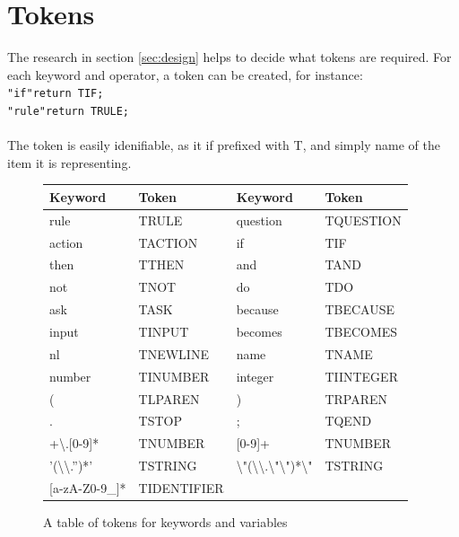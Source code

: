 \documentclass[12pt]{report}
\begin{document}
\section{Tokens}\label{sec:tokens}
The research in section \ref{sec:design} helps to decide what tokens are required.  For each keyword and operator, a token can be created, for instance:\\
\texttt{"if"\quad\quad\quad return TIF;}\\
\texttt{"rule"\quad\quad return TRULE;}\\
\\
The token is easily idenifiable, as it if prefixed with T, and simply name of the item it is representing.
\begin{figure}[H]
	\begin{center}
		\begin{tabular}{ | l | l || l | l |}
			\hline
			\textbf{Keyword} & \textbf{Token} & \textbf{Keyword} & \textbf{Token} \\ \hline
			rule & TRULE & question & TQUESTION \\ \hline
			action & TACTION & if & TIF \\ \hline
			then & TTHEN & and & TAND \\ \hline
			not & TNOT & do & TDO \\ \hline
			ask & TASK & because & TBECAUSE \\ \hline
			input & TINPUT & becomes & TBECOMES \\ \hline
			nl & TNEWLINE & name & TNAME \\ \hline
			number & TINUMBER & integer & TIINTEGER \\ \hline
			( & TLPAREN & ) & TRPAREN \\ \hline
			. & TSTOP & ; & TQEND \\ \hline
			[0-9]+\textbackslash .[0-9]* & TNUMBER & [0-9]+ & TNUMBER \\ \hline
			'(\textbackslash \textbackslash .\textbar ''\textbar [\^{}'\textbackslash n])*' & TSTRING &
			\textbackslash "(\textbackslash\textbackslash .\textbar \textbackslash "\textbackslash 	"\textbar [\^{}\textbackslash n])*\textbackslash " & TSTRING \\ \hline 
			[a-zA-Z\_][a-zA-Z0-9\_]* & TIDENTIFIER  &  &\\ \hline
		\end{tabular}
		\caption{A table of tokens for keywords and variables}\label{fig:token_table}
	\end{center}
\end{figure}
\end{document}
